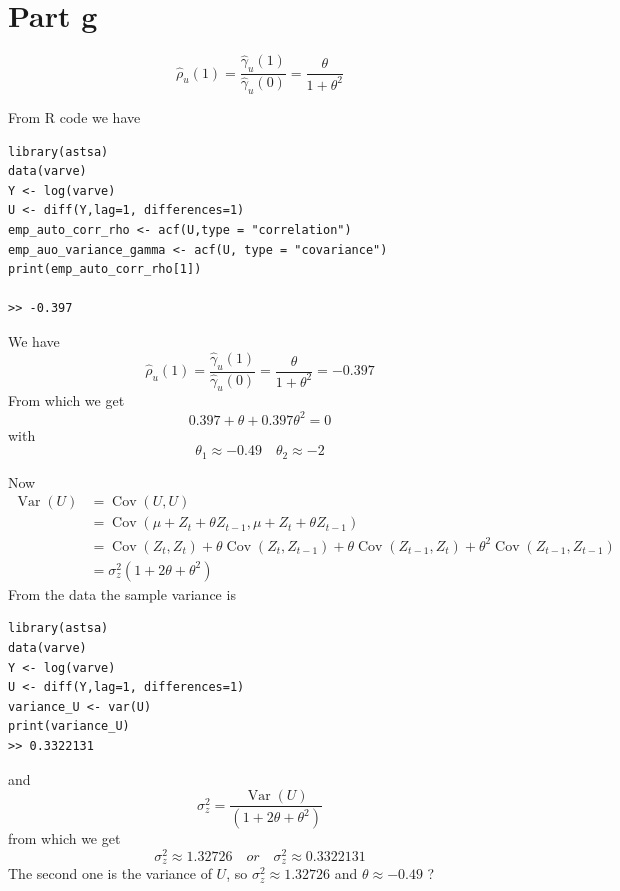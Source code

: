 \documentclass[11pt, oneside]{article}   	%
\newcommand{\Var}{\operatorname{Var}}
\newcommand{\Cov}{\operatorname{Cov}}
\begin{document}
\section{Part g}
\begin{equation}
\hat{\rho}_{u}(1) = \frac{\hat{\gamma}_{u}(1)}{\hat{\gamma}_{u}(0)} = \frac{\theta}{1+\theta^{2}}
\end{equation}

From R code we have 
\begin{lstlisting}
library(astsa)
data(varve)
Y <- log(varve)
U <- diff(Y,lag=1, differences=1)
emp_auto_corr_rho <- acf(U,type = "correlation")
emp_auo_variance_gamma <- acf(U, type = "covariance")
print(emp_auto_corr_rho[1])

>> -0.397
\end{lstlisting}
We have 
\begin{equation}
\hat{\rho}_{u}(1) = \frac{\hat{\gamma}_{u}(1)}{\hat{\gamma}_{u}(0)} = \frac{\theta}{1+\theta^{2}} = -0.397
\end{equation}
From which we get 
\begin{equation}
0.397 + \theta + 0.397\theta^{2}  = 0
\end{equation}
with 
\begin{equation}
 \theta_{1} \approx -0.49\quad \theta_{2} \approx -2
\end{equation}

Now 
\begin{equation}
\begin{aligned}
\Var(U) &= \Cov(U,U) \\
&=\Cov(\mu + Z_{t} + \theta Z_{t-1}, \mu + Z_{t} + \theta Z_{t-1})\\
&=\Cov( Z_{t}, Z_{t})+\theta\Cov( Z_{t}, Z_{t-1})+\theta\Cov( Z_{t-1}, Z_{t})+\theta^{2}\Cov( Z_{t-1}, Z_{t-1})\\
&=\sigma_{z}^{2}(1+2\theta+\theta^{2})
\end{aligned}
\end{equation}
From the data the sample variance is 
\begin{lstlisting}
library(astsa)
data(varve)
Y <- log(varve)
U <- diff(Y,lag=1, differences=1)
variance_U <- var(U)
print(variance_U)
>> 0.3322131
\end{lstlisting}
and 
\begin{equation}
\sigma_{z}^{2} = \frac{\Var(U)}{(1+2\theta+\theta^{2})} 
\end{equation}
from which we get
\begin{equation}
 \sigma_{z}^{2} \approx 1.32726\quad or \quad  \sigma_{z}^{2} \approx 0.3322131
\end{equation}
The second one is the variance of $U$, so $\sigma_{z}^{2} \approx 1.32726$ and $\theta \approx -0.49$ ?
\end{document}
